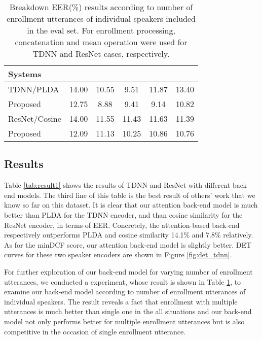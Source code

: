 \documentclass[a4paper]{article}
\begin{document}
\setlength{\tabcolsep}{1.5mm}
\begin{table}[t]
\footnotesize
  \caption{Breakdown EER(\%) results according to number of enrollment utterances of individual speakers included in the eval set. For enrollment processing, concatenation and mean operation were used for TDNN and ResNet cases, respectively.}
  \label{tab:result1-breakdown}
  \vspace{-2mm}
  \centering
  \begin{tabular}{l c c c c c}
    \toprule
    \textbf{Systems} & \textbf{} & \textbf{} & \textbf{} & \textbf{} & \textbf{}\\
    \midrule
    TDNN/PLDA     & 14.00    & 10.55   & 9.51  &    11.87 & 13.40         \\
    Proposed      & 12.75    & 8.88    & 9.41  &    9.14  & 10.82        \\ \midrule
    ResNet/Cosine & 14.00    & 11.55   & 11.43 &    11.63 & 11.39        \\
    Proposed      & 12.09    & 11.13   & 10.25 &    10.86 & 10.76        \\
    \bottomrule
  \end{tabular}
\end{table}

\vspace{-1.5mm}
\subsection{Results}
Table \ref{tab:result1} shows the results of TDNN and ResNet with different back-end models. The third line of this table is the best result of others' work that we know so far on this dataset. It is clear that our attention back-end model is much better than PLDA for the TDNN encoder, and than cosine similarity for the ResNet encoder, in terms of EER. Concretely, the attention-based back-end respectively outperforms PLDA and cosine similarity 14.1\% and 7.8\% relatively. As for the minDCF score, our attention back-end model is slightly better. DET curves for these two speaker encoders are shown in Figure \ref{fig:det_tdnn}.

For further exploration of our back-end model for varying number of enrollment utterances, we conducted a experiment, whose result is shown in Table \ref{tab:result1-breakdown}, to examine our back-end model according to number of enrollment utterances of individual speakers. The result reveals a fact that enrollment with multiple utterances is much better than single one in the all situations and our back-end model not only performs better for multiple enrollment utterances but is also competitive in the occasion of single enrollment utterance.
\end{document}
